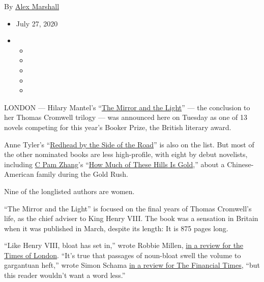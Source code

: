 By \href{https://www.nytimes3xbfgragh.onion/by/alex-marshall}{Alex
Marshall}

\begin{itemize}
\item
  July 27, 2020
\item
  \begin{itemize}
  \item
  \item
  \item
  \item
  \item
  \end{itemize}
\end{itemize}

LONDON --- Hilary Mantel's
``\href{https://www.nytimes3xbfgragh.onion/2020/03/03/books/review-mirror-light-hilary-mantel.html}{The
Mirror and the Light}'' --- the conclusion to her Thomas Cromwell
trilogy --- was announced here on Tuesday as one of 13 novels competing
for this year's Booker Prize, the British literary award.

Anne Tyler's
``\href{https://www.nytimes3xbfgragh.onion/2020/04/07/books/review/redhead-by-the-side-of-the-road-anne-tyler.html}{Redhead
by the Side of the Road}'' is also on the list. But most of the other
nominated books are less high-profile, with eight by debut novelists,
including
\href{https://www.nytimes3xbfgragh.onion/2020/04/04/books/c-pam-zhang-how-much-of-these-hills-is-gold.html}{C
Pam Zhang}'s
``\href{https://www.nytimes3xbfgragh.onion/2020/04/07/books/review/how-much-of-these-hills-is-gold-c-pam-zhang.html}{How
Much of These Hills Is Gold},'' about a Chinese-American family during
the Gold Rush.

Nine of the longlisted authors are women.

``The Mirror and the Light'' is focused on the final years of Thomas
Cromwell's life, as the chief adviser to King Henry VIII. The book was a
sensation in Britain when it was published in March, despite its length:
It is 875 pages long.

``Like Henry VIII, bloat has set in,'' wrote Robbie Millen,
\href{https://www.thetimes.co.uk/article/the-mirror-and-the-light-by-hilary-mantel-review-5d73zvlpv}{in
a review for the Times of London}. ``It's true that passages of
noun-bloat swell the volume to gargantuan heft,'' wrote Simon Schama
\href{https://www.ft.com/content/e52e9200-57bb-11ea-a528-dd0f971febbc?accessToken=zwAAAXOQsTOYkdPlLpIAV7sR6tOlKN0Plx_rvA.MEQCIHEpEfi4JW9qMeSu48FLNSBGC9GMiUE00t5wnOiIlZutAiB3x-V2IiTLZddRbMg_NE2IUOU4ExHG0C1bv0HNsAPQBw\&sharetype=gift?token=92f7106d-6113-49a3-b937-400e0280d1e8}{in
a review for The Financial Times}, ``but this reader wouldn't want a
word less.''

